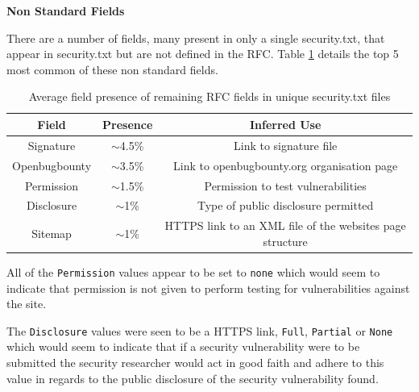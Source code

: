 \documentclass{mscreport}
\begin{document}
\vspace{0.7cm} \noindent
\textbf{Non Standard Fields}

\noindent
There are a number of fields, many present in only a single security.txt, that appear in security.txt but are not defined in the RFC. Table \ref{table:security_txt_by_non_rfc_fields} details the top 5 most common of these non standard fields.

\begin{table}[H]
  \begin{center}
    \begin{tabular}{|c|c|c|}  %
      \hline
      \textbf{Field} & \textbf{Presence} & \textbf{Inferred Use}\\
      \hline
      Signature & $\sim$4.5\% & Link to signature file\\
      \hline
      Openbugbounty & $\sim$3.5\% & Link to openbugbounty.org organisation page\\
      \hline
      Permission & $\sim$1.5\% & Permission to test vulnerabilities\\
      \hline
      Disclosure & $\sim$1\% & Type of public disclosure permitted\\
      \hline
      Sitemap & $\sim$1\% & HTTPS link to an XML file of the websites page structure\\
      \hline
    \end{tabular}
    \caption{Average field presence of remaining RFC fields in unique security.txt files}
    \label{table:security_txt_by_non_rfc_fields} %
  \end{center}
\end{table}

\noindent
All of the \texttt{Permission} values appear to be set to \texttt{none} which would seem to indicate that permission is not given to perform testing for vulnerabilities against the site.

\vspace{0.3cm} \noindent
The \texttt{Disclosure} values were seen to be a HTTPS link, \texttt{Full}, \texttt{Partial} or \texttt{None} which would seem to indicate that if a security vulnerability were to be submitted the security researcher would act in good faith and adhere to this value in regards to the public disclosure of the security vulnerability found.
\end{document}
